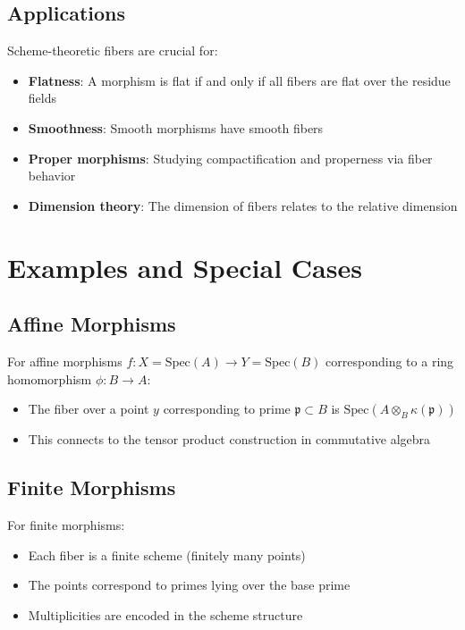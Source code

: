 \documentclass{article}
\theoremstyle{definition}
\begin{document}
\subsection{Applications}

Scheme-theoretic fibers are crucial for:
\begin{itemize}
\item \textbf{Flatness}: A morphism is flat if and only if all fibers are flat over the residue fields
\item \textbf{Smoothness}: Smooth morphisms have smooth fibers
\item \textbf{Proper morphisms}: Studying compactification and properness via fiber behavior
\item \textbf{Dimension theory}: The dimension of fibers relates to the relative dimension
\end{itemize}

\section{Examples and Special Cases}

\subsection{Affine Morphisms}

For affine morphisms $f: X = \mathrm{Spec}(A) \to Y = \mathrm{Spec}(B)$ corresponding to a ring homomorphism $\phi: B \to A$:
\begin{itemize}
\item The fiber over a point $y$ corresponding to prime $\mathfrak{p} \subset B$ is $\mathrm{Spec}(A \otimes_B \kappa(\mathfrak{p}))$
\item This connects to the tensor product construction in commutative algebra
\end{itemize}

\subsection{Finite Morphisms}

For finite morphisms:
\begin{itemize}
\item Each fiber is a finite scheme (finitely many points)
\item The points correspond to primes lying over the base prime
\item Multiplicities are encoded in the scheme structure
\end{itemize}
\end{document}
